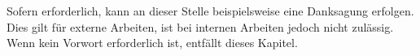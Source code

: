 Sofern erforderlich, kann an dieser Stelle beispielsweise eine Danksagung erfolgen. Dies gilt für externe Arbeiten, ist bei internen Arbeiten jedoch nicht zulässig. Wenn kein Vorwort erforderlich ist, entfällt dieses Kapitel.
